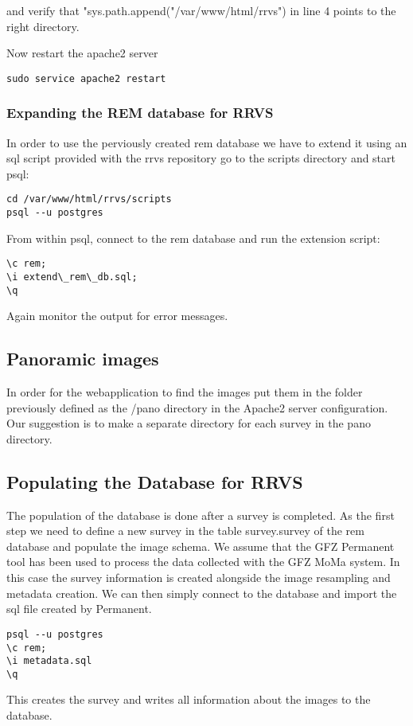 \documentclass{article}
\begin{document}
and verify that "sys.path.append("/var/www/html/rrvs") in line 4 points to the right directory.

Now restart the apache2 server 
\begin{verbatim}
sudo service apache2 restart
\end{verbatim}

\subsubsection{Expanding the REM database for RRVS}
In order to use the perviously created rem database we have to extend
it using an sql script provided with the rrvs repository
go to the scripts directory and start psql:
\begin{verbatim}
cd /var/www/html/rrvs/scripts
psql --u postgres
\end{verbatim}
From within psql, connect to the rem database and run the extension
script:
\begin{verbatim}
\c rem;
\i extend\_rem\_db.sql;
\q
\end{verbatim}
Again monitor the output for error messages.

\subsection{Panoramic images}
In order for the webapplication to find the images put them
in the folder previously defined as the /pano directory in the 
Apache2 server configuration. Our suggestion is to make a 
separate directory for each survey in the pano directory. 

\subsection{Populating the Database for RRVS}
The population of the database is done after a survey is completed.
As the first step we need to define a new survey in the table 
survey.survey of the rem database and populate the image schema. 
We assume that the GFZ Permanent tool has been used to process the 
data collected with the GFZ MoMa system. In this case the survey 
information is created alongside the image resampling and metadata 
creation. We can then simply connect to the database and import
the sql file created by Permanent.

\begin{verbatim}
psql --u postgres
\c rem;
\i metadata.sql
\q
\end{verbatim}
This creates the survey and writes all information about the images 
to the database.
\end{document}
